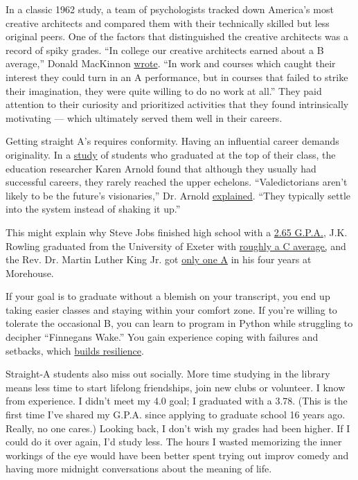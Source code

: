 In a classic 1962 study, a team of psychologists tracked down America's
most creative architects and compared them with their technically
skilled but less original peers. One of the factors that distinguished
the creative architects was a record of spiky grades. ``In college our
creative architects earned about a B average,'' Donald MacKinnon
\href{http://psycnet.apa.org/record/1963-04959-001}{wrote}. ``In work
and courses which caught their interest they could turn in an A
performance, but in courses that failed to strike their imagination,
they were quite willing to do no work at all.'' They paid attention to
their curiosity and prioritized activities that they found intrinsically
motivating --- which ultimately served them well in their careers.

Getting straight A's requires conformity. Having an influential career
demands originality. In a
\href{https://www.amazon.com/Lives-Promise-Valedictorians-Fourteen-year-Achievement/dp/0787901466}{study}
of students who graduated at the top of their class, the education
researcher Karen Arnold found that although they usually had successful
careers, they rarely reached the upper echelons. ``Valedictorians aren't
likely to be the future's visionaries,'' Dr. Arnold
\href{http://time.com/money/4779223/valedictorian-success-research-barking-up-wrong/}{explained}.
``They typically settle into the system instead of shaking it up.''

This might explain why Steve Jobs finished high school with a
\href{https://www.theatlantic.com/technology/archive/2012/02/what-was-steve-jobss-high-school-gpa-not-40-or-even-30/252828/}{2.65
G.P.A.}, J.K. Rowling graduated from the University of Exeter with
\href{https://www.thetimes.co.uk/article/got-a-22-like-to-get-stoned-youre-hired-3wxrlczdmtx}{roughly
a C average,} and the Rev. Dr. Martin Luther King Jr. got
\href{https://kinginstitute.stanford.edu/sites/default/files/morehouse_years.pdf}{only
one A} in his four years at Morehouse.

If your goal is to graduate without a blemish on your transcript, you
end up taking easier classes and staying within your comfort zone. If
you're willing to tolerate the occasional B, you can learn to program in
Python while struggling to decipher ``Finnegans Wake.'' You gain
experience coping with failures and setbacks, which
\href{https://reason.com/archives/2017/10/26/the-fragile-generation}{builds
resilience}.

Straight-A students also miss out socially. More time studying in the
library means less time to start lifelong friendships, join new clubs or
volunteer. I know from experience. I didn't meet my 4.0 goal; I
graduated with a 3.78. (This is the first time I've shared my G.P.A.
since applying to graduate school 16 years ago. Really, no one cares.)
Looking back, I don't wish my grades had been higher. If I could do it
over again, I'd study less. The hours I wasted memorizing the inner
workings of the eye would have been better spent trying out improv
comedy and having more midnight conversations about the meaning of life.

